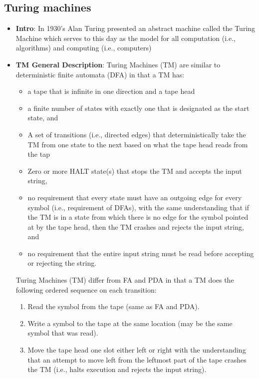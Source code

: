 \documentclass{report}
\begin{document}
    \pagebreak 
    \subsection{Turing machines}
    \begin{itemize}
        \item \textbf{Intro}: In 1930’s Alan Turing presented an abstract machine called the Turing Machine which serves to this day as the model for all computation (i.e., algorithms) and computing (i.e., computers)
        \item \textbf{TM General Description}: Turing Machines (TM) are similar to deterministic finite automata (DFA) in that a TM has:
            \begin{itemize}
                \item a tape that is infinite in one direction and a tape head
                \item a finite number of states with exactly one that is designated as the start state, and
                \item A set of transitions (i.e., directed edges) that deterministically take the TM from one state to the next based on what the tape head reads from the tap
                \item Zero or more HALT state(s) that stops the TM and accepts the input string,
                \item no requirement that every state must have an outgoing edge for every symbol (i.e., requirement of DFAs), with the same understanding that if the TM is in a state from which there is no edge for the symbol pointed at by the tape head, then the TM crashes and rejects the input string, and
                \item no requirement that the entire input string must be read before accepting or rejecting the string.
            \end{itemize}
            \bigbreak \noindent 
            Turing Machines (TM) differ from FA and PDA in that a TM does the following ordered sequence on each transition:
            \begin{enumerate}
                \item Read the symbol from the tape (same as FA and PDA).
                \item Write a symbol to the tape at the same location (may be the same symbol that was read).
                \item Move the tape head one slot either left or right with the understanding that an attempt to move left from the leftmost part of the tape crashes the TM (i.e., halts execution and rejects the input string).

\end{enumerate}
\end{itemize}
\end{document}
